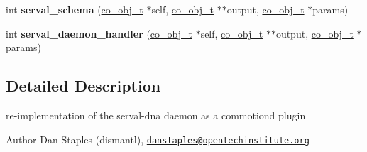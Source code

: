 \begin{DoxyCompactItemize}
\item 
\hypertarget{serval-dna_8h_a0e0920eff3548cf56da6e9f8c5c4e5ab}{int {\bfseries serval\-\_\-schema} (\hyperlink{structco__obj__t}{co\-\_\-obj\-\_\-t} $\ast$self, \hyperlink{structco__obj__t}{co\-\_\-obj\-\_\-t} $\ast$$\ast$output, \hyperlink{structco__obj__t}{co\-\_\-obj\-\_\-t} $\ast$params)}\label{serval-dna_8h_a0e0920eff3548cf56da6e9f8c5c4e5ab}

\item 
\hypertarget{serval-dna_8h_a31d498ab46d883bda2967eca577b8890}{int {\bfseries serval\-\_\-daemon\-\_\-handler} (\hyperlink{structco__obj__t}{co\-\_\-obj\-\_\-t} $\ast$self, \hyperlink{structco__obj__t}{co\-\_\-obj\-\_\-t} $\ast$$\ast$output, \hyperlink{structco__obj__t}{co\-\_\-obj\-\_\-t} $\ast$params)}\label{serval-dna_8h_a31d498ab46d883bda2967eca577b8890}

\end{DoxyCompactItemize}


\subsection{Detailed Description}
re-\/implementation of the serval-\/dna daemon as a commotiond plugin \begin{DoxyAuthor}{Author}
Dan Staples (dismantl), \href{mailto:danstaples@opentechinstitute.org}{\tt danstaples@opentechinstitute.\-org} 
\end{DoxyAuthor}


